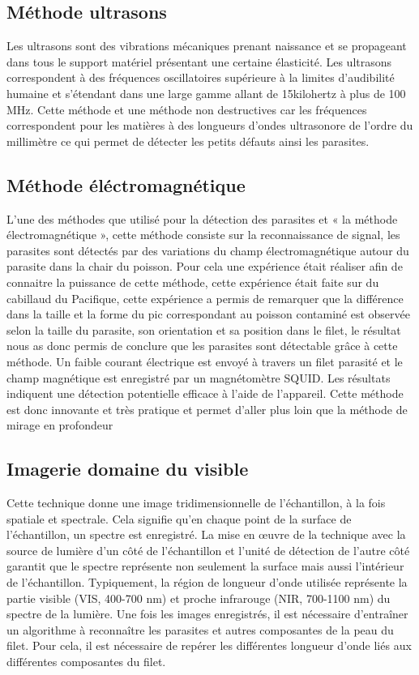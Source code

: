 \documentclass[12pt,a4paper]{article}
\begin{document}
\subsection{Méthode ultrasons}

Les ultrasons sont des vibrations mécaniques prenant naissance et se propageant dans tous le support matériel présentant une certaine élasticité.
Les ultrasons correspondent à des fréquences oscillatoires supérieure à la limites d’audibilité humaine et s’étendant dans une large gamme allant de 15kilohertz à plus de 100 MHz.
Cette méthode et une méthode non destructives car les fréquences correspondent pour les matières à des longueurs d’ondes ultrasonore de l’ordre du millimètre ce qui permet de détecter les petits défauts ainsi les parasites. 

\subsection{Méthode éléctromagnétique}

L’une des méthodes que utilisé pour la détection des parasites et  « la méthode électromagnétique », cette méthode consiste sur la reconnaissance de signal, les parasites sont détectés  par des variations du champ électromagnétique autour du parasite dans la chair du poisson.
Pour cela une expérience était réaliser afin de connaitre la puissance de cette méthode, cette expérience était faite sur du cabillaud du Pacifique, cette expérience a permis de remarquer que la différence dans la taille et la forme du pic correspondant au poisson contaminé est observée selon la taille du parasite, son orientation et sa position dans le filet, le résultat nous as donc permis  de conclure que les parasites sont détectable grâce à cette méthode. Un faible courant électrique est envoyé à travers un filet parasité et le champ magnétique est enregistré par un magnétomètre SQUID. Les résultats indiquent une détection potentielle efficace à l'aide de l'appareil.
Cette méthode est donc innovante et très pratique et permet d’aller plus loin que la méthode de mirage en profondeur



\subsection{Imagerie domaine du visible}


Cette technique donne une image tridimensionnelle de l'échantillon, à la fois spatiale et spectrale. Cela signifie qu'en chaque point de la surface de l'échantillon, un spectre est enregistré. La mise en œuvre de la technique avec la source de lumière d'un côté de l'échantillon et l'unité de détection de l'autre côté garantit que le spectre représente non seulement la surface mais aussi l'intérieur de l'échantillon.
Typiquement, la région de longueur d'onde utilisée représente la partie visible (VIS, 400-700 nm) et proche infrarouge (NIR, 700-1100 nm) du spectre de la lumière.
Une fois les images enregistrés, il est nécessaire d'entraîner un algorithme à reconnaître les parasites et autres composantes de la peau du filet.
Pour cela, il est nécessaire de repérer les différentes longueur d'onde liés aux différentes composantes du filet.
\end{document}
